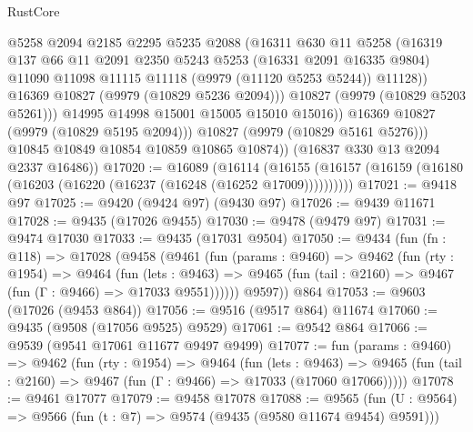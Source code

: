\begin{lexlean}{RustCore}
\begin{coremodule}
                      @5258
                      @2094
                      @2185
                      @2295
                      @5235
                      @2088
                      (@16311
                        @630
                        @11
                        @5258
                        (@16319
                          @137
                          @66
                          @11
                          @2091
                          @2350
                          @5243
                          @5253
                          (@16331 @2091 @16335 @9804)
                          @11090
                          @11098
                          @11115
                          @11118
                          (@9979 (@11120 @5253 @5244))
                          @11128))
                      @16369
                      @10827
                      (@9979 (@10829 @5236 @2094)))
                    @10827
                    (@9979 (@10829 @5203 @5261)))
                  @14995
                  @14998
                  @15001
                  @15005
                  @15010
                  @15016))
              @16369
              @10827
              (@9979 (@10829 @5195 @2094)))
            @10827
            (@9979 (@10829 @5161 @5276)))
          @10845
          @10849
          @10854
          @10859
          @10865
          @10874))
      (@16837 @330 @13 @2094 @2337 @16486))
@17020 := @16089
    (@16114 (@16155 (@16157 (@16159 (@16180 (@16203 (@16220 (@16237 (@16248 (@16252 @17009))))))))))
@17021 := @9418 @97
@17025 := @9420 (@9424 @97) (@9430 @97)
@17026 := @9439 @11671
@17028 := @9435 (@17026 @9455)
@17030 := @9478 (@9479 @97)
@17031 := @9474 @17030
@17033 := @9435 (@17031 @9504)
@17050 := @9434
    (fun (fn : @118) =>
    @17028
      (@9458
        (@9461
          (fun (params : @9460) =>
          @9462
            (fun (rty : @1954) =>
            @9464
              (fun (lets : @9463) =>
              @9465 (fun (tail : @2160) => @9467 (fun (Γ : @9466) => @17033 @9551))))))
        @9597))
    @864
@17053 := @9603 (@17026 (@9453 @864))
@17056 := @9516 (@9517 @864) @11674
@17060 := @9435 (@9508 (@17056 @9525) @9529)
@17061 := @9542 @864
@17066 := @9539 (@9541 @17061 @11677 @9497 @9499)
@17077 := fun (params : @9460) =>
  @9462
    (fun (rty : @1954) =>
    @9464
      (fun (lets : @9463) =>
      @9465 (fun (tail : @2160) => @9467 (fun (Γ : @9466) => @17033 (@17060 @17066)))))
@17078 := @9461 @17077
@17079 := @9458 @17078
@17088 := @9565
    (fun (U : @9564) => @9566 (fun (t : @7) => @9574 (@9435 (@9580 @11674 @9454) @9591)))

\end{coremodule}
\end{lexlean}
